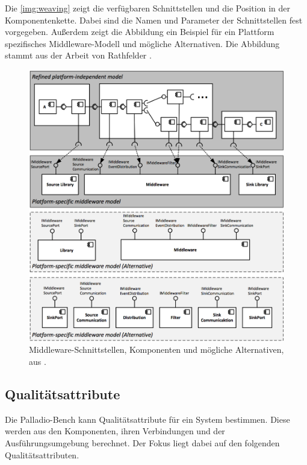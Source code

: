 Die \autoref{img:weaving} zeigt die verfügbaren Schnittstellen und die Position in der Komponentenkette. Dabei sind die Namen und Parameter der Schnittstellen fest vorgegeben. Außerdem zeigt die Abbildung ein Beispiel für ein Plattform spezifisches Middleware-Modell und mögliche Alternativen. Die Abbildung stammt aus der Arbeit von Rathfelder \cite{Rathfelder2013}.

\begin{figure}
\center
  \includegraphics[width=1\textwidth]{images/grundlagen/middleware-model-weaving.png}
  \caption{Middleware-Schnittstellen, Komponenten und mögliche Alternativen, aus \cite{Rathfelder2013}.}
  \label{img:weaving}
\end{figure}

\subsection{Qualitätsattribute}
Die Palladio-Bench kann Qualitätsattribute für ein System bestimmen. Diese werden aus den Komponenten, ihren Verbindungen und der Ausführungsumgebung berechnet. Der Fokus liegt dabei auf den folgenden Qualitätsattributen. 
